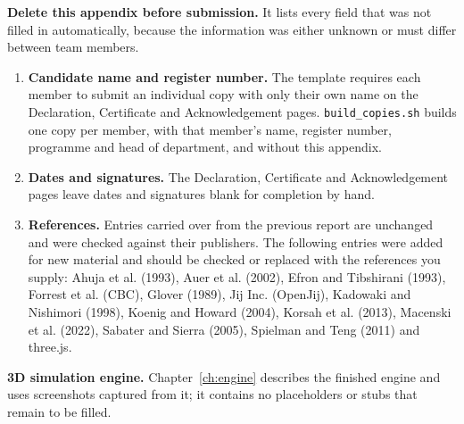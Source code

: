 \clearpage
{}
\label{app:fill}

\noindent\textbf{Delete this appendix before submission.} It lists every
field that was not filled in automatically, because the information was
either unknown or must differ between team members.

\begin{enumerate}[label=\arabic*.]
\item \textbf{Candidate name and register number.} The template requires each
member to submit an individual copy with only their own name on the
Declaration, Certificate and Acknowledgement pages. \verb|build_copies.sh|
builds one copy per member, with that member's name, register number,
programme and head of department, and without this appendix.
\item \textbf{Dates and signatures.} The Declaration, Certificate and
Acknowledgement pages leave dates and signatures blank for completion by hand.
\item \textbf{References.} Entries carried over from the previous report are
unchanged and were checked against their publishers. The following entries were added for new material and should
be checked or replaced with the references you supply: Ahuja et al. (1993),
Auer et al. (2002), Efron and Tibshirani (1993), Forrest et al. (CBC),
Glover (1989), Jij Inc. (OpenJij), Kadowaki and Nishimori (1998), Koenig and
Howard (2004), Korsah et al. (2013), Macenski et al. (2022), Sabater and
Sierra (2005), Spielman and Teng (2011) and three.js.
\end{enumerate}

\noindent\textbf{3D simulation engine.} Chapter~\ref{ch:engine} describes the
finished engine and uses screenshots captured from it; it contains no
placeholders or stubs that remain to be filled.
